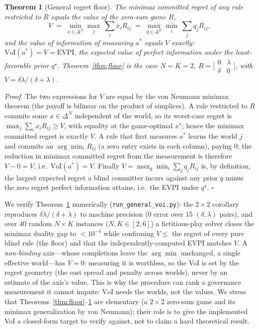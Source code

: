 \documentclass{article} %
\newtheorem{theorem}{Theorem}
\newcommand{\VoI}{\mathrm{VoI}}
\begin{document}
\begin{theorem}[General regret floor]
\label{thm:general}
The minimax committed regret of any rule restricted to $R$ equals the value of the zero-sum game $R$,
\[
V \;=\; \min_{x\in\Delta^N}\max_{j}\ \textstyle\sum_i x_i R_{ij}\;=\;\max_{q\in\Delta^K}\min_{i}\ \textstyle\sum_j q_j R_{ij},
\]
and the value of information of measuring $a^*$ equals $V$ exactly: $\VoI(a^*)=V=\mathrm{EVPI}$, the expected value of perfect information under the least-favorable prior $q^\star$. Theorem~\ref{thm:floor} is the case $N=K=2$, $R=\big[\begin{smallmatrix}0&\lambda\\\delta&0\end{smallmatrix}\big]$, with $V=\delta\lambda/(\delta+\lambda)$.
\end{theorem}

\emph{Proof.} The two expressions for $V$ are equal by the von Neumann minimax theorem (the payoff is bilinear on the product of simplices). A rule restricted to $R$ commits some $x\in\Delta^N$ independent of the world, so its worst-case regret is $\max_j \sum_i x_i R_{ij}\ge V$, with equality at the game-optimal $x^\star$; hence the minimax committed regret is exactly $V$. A rule that first measures $a^*$ learns the world $j$ and commits an $\arg\min_i R_{ij}$ (a zero entry exists in each column), paying $0$; the reduction in minimax committed regret from the measurement is therefore $V-0=V$, i.e.\ $\VoI(a^*)=V$. Finally $V=\max_q\min_i\sum_j q_j R_{ij}$ is, by definition, the largest expected regret a blind committer incurs against any prior $q$ minus the zero regret perfect information attains, i.e.\ the EVPI under $q^\star$. \hfill$\square$

We verify Theorem~\ref{thm:general} numerically (\texttt{run\_general\_voi.py}): the $2\times 2$ corollary reproduces $\delta\lambda/(\delta+\lambda)$ to machine precision ($0$ error over $15$ $(\delta,\lambda)$ pairs), and over $40$ random $N\times K$ instances ($N,K\in[2,6]$) a fictitious-play solver closes the minimax duality gap to $<10^{-4}$ while confirming $V\le$ the regret of every pure blind rule (the floor) and that the independently-computed EVPI matches $V$. A \emph{non-binding} axis---whose completions leave the $\arg\min$ unchanged, a single effective world---has $V=0$: measuring it is worthless, so the VoI is set by the regret geometry (the cost spread and penalty across worlds), never by an estimate of the axis's value. This is why the procedure can rank a governance measurement it cannot impute: $\VoI$ needs the worlds, not the values. We stress that Theorems~\ref{thm:floor}--\ref{thm:general} are elementary (a $2\times2$ zero-sum game and its minimax generalization by von Neumann); their role is to give the implemented VoI a closed-form target to verify against, not to claim a hard theoretical result.
\end{document}
